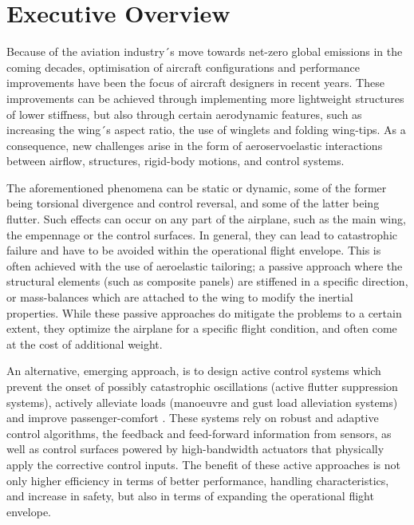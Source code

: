 \chapter{Executive Overview}

Because of the aviation industry´s move towards net-zero global emissions in the coming decades, optimisation of aircraft configurations and performance improvements have been the focus of aircraft designers in recent years. These improvements can be achieved through implementing more lightweight structures of lower stiffness, but also through certain aerodynamic features, such as increasing the wing´s aspect ratio, the use of winglets and folding wing-tips. As a consequence, new challenges arise in the form of aeroservoelastic interactions between airflow, structures, rigid-body motions, and control systems. 

The aforementioned phenomena can be static or dynamic, some of the former being torsional divergence and control reversal, and some of the latter being flutter. Such effects can occur on any part of the airplane, such as the main wing, the empennage or the control surfaces. In general, they can lead to catastrophic failure and have to be avoided within the operational flight envelope. This is often achieved with the use of aeroelastic tailoring; a passive approach where the structural elements (such as composite panels) are stiffened in a specific direction, or mass-balances which are attached to the wing to modify the inertial properties. While these passive approaches do mitigate the problems to a certain extent, they optimize the airplane for a specific flight condition, and often come at the cost of additional weight.

An alternative, emerging approach, is to design active control systems which prevent the onset of possibly catastrophic oscillations (active flutter suppression systems), actively alleviate loads (manoeuvre and gust load alleviation systems) and improve passenger-comfort \cite{livne}. These systems rely on robust and adaptive control algorithms, the feedback and feed-forward information from sensors, as well as control surfaces powered by high-bandwidth actuators that physically apply the corrective control inputs. The benefit of these active approaches is not only higher efficiency in terms of better performance, handling characteristics, and increase in safety, but also in terms of expanding the operational flight envelope.

